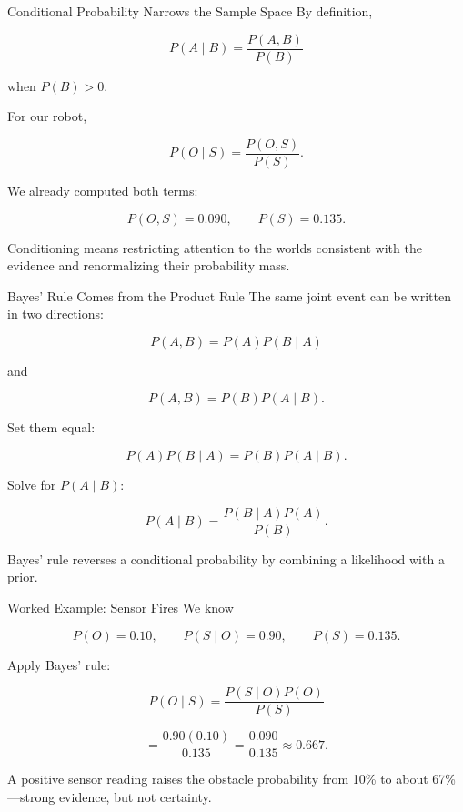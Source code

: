 \documentclass[aspectratio=169,10pt]{beamer}
\begin{document}
\begin{frame}[shrink=10]{Conditional Probability Narrows the Sample Space}
  By definition,

  \[
    P(A\mid B)=\frac{P(A,B)}{P(B)}
  \]

  when $P(B)>0$.

  For our robot,

  \[
    P(O\mid S)=\frac{P(O,S)}{P(S)}.
  \]

  We already computed both terms:

  \[
    P(O,S)=0.090,
    \qquad
    P(S)=0.135.
  \]

  \begin{keyidea}
    Conditioning means restricting attention to the worlds consistent with the evidence and renormalizing their probability mass.
  \end{keyidea}
\end{frame}

\begin{frame}[shrink=10]{Bayes' Rule Comes from the Product Rule}
  The same joint event can be written in two directions:

  \[
    P(A,B)=P(A)P(B\mid A)
  \]

  and

  \[
    P(A,B)=P(B)P(A\mid B).
  \]

  Set them equal:

  \[
    P(A)P(B\mid A)=P(B)P(A\mid B).
  \]

  Solve for $P(A\mid B)$:

  \[
    \boxed{P(A\mid B)=\frac{P(B\mid A)P(A)}{P(B)}}.
  \]

  \begin{keyidea}
    Bayes' rule reverses a conditional probability by combining a likelihood with a prior.
  \end{keyidea}
\end{frame}

\begin{frame}[shrink=10]{Worked Example: Sensor Fires}
  We know

  \[
    P(O)=0.10,
    \qquad
    P(S\mid O)=0.90,
    \qquad
    P(S)=0.135.
  \]

  Apply Bayes' rule:

  \[
    P(O\mid S)
    =\frac{P(S\mid O)P(O)}{P(S)}
  \]

  \[
    =\frac{0.90(0.10)}{0.135}
    =\frac{0.090}{0.135}
    \approx \boxed{0.667}.
  \]

  \begin{keyidea}
    A positive sensor reading raises the obstacle probability from 10\% to about 67\%---strong evidence, but not certainty.
  \end{keyidea}
\end{frame}
\end{document}
